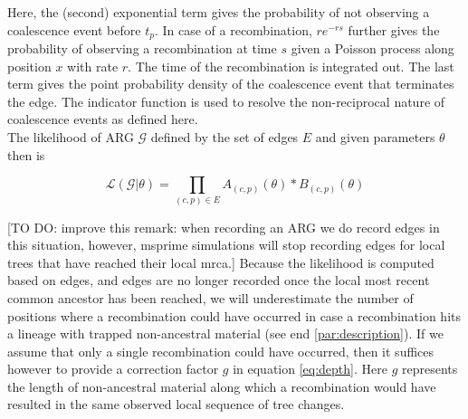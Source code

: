 \documentclass{article}
\begin{document}
Here, the (second) exponential term gives the probability of not observing a 
coalescence event before $t_p$. In case of a recombination, $re^{-rs}$ further 
gives the probability of observing a recombination 
at time $s$ given a Poisson process along position $x$ with rate $r$. The 
time of the recombination is integrated out.
The last term gives the point probability density of the coalescence event 
that terminates the edge. The indicator function is used to resolve 
the non-reciprocal nature of coalescence events as defined here.\\

The likelihood of ARG $\mathcal{G}$ defined by the set of edges $E$ and
given parameters $\theta$ then is

\begin{equation}\label{eq:full-lik}
\mathcal{L}(\mathcal{G}|\theta) = \prod_{(c, p) \in E} A_{(c, p)}(\theta) * B_{(c, p)}(\theta)
\end{equation}


[TO DO: improve this remark: when recording an ARG we do record edges in this situation,
however, msprime simulations will stop recording edges for local trees that have reached 
their local mrca.] 
Because the likelihood is computed based on edges,
and edges are no longer recorded once the local most recent common ancestor 
has been reached, we will underestimate the number of positions where 
a recombination could have occurred in case a recombination hits a 
lineage with trapped non-ancestral material (see end \ref{par:description}). 
If we assume that only a single recombination could have  
occurred, then it suffices however to provide a correction factor $g$ in equation
\ref{eq:depth}. Here $g$ represents the 
length of non-ancestral material along which a recombination would have resulted  
in the same observed local sequence of tree changes.\\
\end{document}
